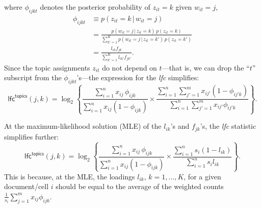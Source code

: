 \documentclass[final]{siamart171218}
\begin{document}
where $\phi_{ijkt}$ denotes the posterior probability of $z_{it} = k$
given $w_{it} = j$,
\begin{align}
\phi_{ijkt} &\equiv p(z_{it} = k \,|\, w_{it} = j) \nonumber \\
&= \frac{p(w_{it} = j \,|\, z_{it} = k) \, p(z_{it} = k)}
        {\sum_{k'=1}^K p(w_{it} = j \,|\, z_{it} = k') \, p(z_{it} = k')} 
   \nonumber \\
&= \frac{l_{ik} f_{jk}}
        {\sum_{k'=1}^K l_{ik'} f_{jk'}}.
\end{align}
Since the topic assignments $z_{it}$ do not depend on $t$---that is,
we can drop the ``$t$'' subscript from the $\phi_{ijkt}$'s---the expression
for the {\em lfc} simplifies:
\begin{equation}
\mathsf{lfc}^{\mathsf{topics}}(j,k) = \log_2 \left\{ 
\frac{\sum_{i=1}^n x_{ij} \, \phi_{ijk}}
     {\sum_{i=1}^n x_{ij} (1 - \phi_{ijk})}
     \times \frac{\sum_{i=1}^n \sum_{j'=1}^m x_{ij'} (1-\phi_{ij'k})}
                 {\sum_{i=1}^n \sum_{j'=1}^m x_{ij'} \phi_{ij'k}} \right\}.
\end{equation}

At the maximum-likelihood solution (MLE) of the $l_{ik}$'s and $f_{jk}$'s,
the {\em lfc} statistic simplifies further:
\begin{equation}
\mathsf{lfc}^{\mathsf{topics}}(j,k) = 
\log_2 \left\{ \frac{\sum_{i=1}^n x_{ij} \, \phi_{ijk}}
                    {\sum_{i=1}^n x_{ij} (1 - \phi_{ijk})} \times
               \frac{\sum_{i=1}^n s_i (1 - l_{ik})}
                    {\sum_{i=1}^n s_i l_{ik}} \right\}.
\label{eq:lfc-topic-mle}
\end{equation}
This is because, at the MLE, the loadings $l_{ik}$, $k = 1, \ldots,
K$, for a given document/cell $i$ should be equal to the average of
the weighted counts $\frac{1}{s_i} \sum_{j=1}^m x_{ij} \phi_{ijk}$. 
\end{document}
